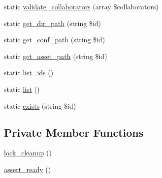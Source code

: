 \begin{DoxyCompactItemize}
static \hyperlink{classlibresignage_1_1common_1_1php_1_1slide_1_1Slide_a24d9d8a3e7fafb5fe6fc904b71ea732d}{validate\+\_\+collaborators} (array \$collaborators)
\item 
static \hyperlink{classlibresignage_1_1common_1_1php_1_1slide_1_1Slide_a11ba3a6fead2f889211a368a70b56a08}{get\+\_\+dir\+\_\+path} (string \$id)
\item 
static \hyperlink{classlibresignage_1_1common_1_1php_1_1slide_1_1Slide_a347881c12e3a389c8b4f3397328e8378}{get\+\_\+conf\+\_\+path} (string \$id)
\item 
static \hyperlink{classlibresignage_1_1common_1_1php_1_1slide_1_1Slide_a33bc0e5eadddc415740b36f1dded4159}{get\+\_\+asset\+\_\+path} (string \$id)
\item 
static \hyperlink{classlibresignage_1_1common_1_1php_1_1slide_1_1Slide_a234a166c9a496c6484629bae1f078318}{list\+\_\+ids} ()
\item 
static \hyperlink{classlibresignage_1_1common_1_1php_1_1slide_1_1Slide_aac4106d3da3ec25c0bf52e5b050cf336}{list} ()
\item 
static \hyperlink{classlibresignage_1_1common_1_1php_1_1slide_1_1Slide_a1b2ac4d07a7a9b2e2bf67bcbbaee0130}{exists} (string \$id)
\end{DoxyCompactItemize}
\subsection*{Private Member Functions}
\begin{DoxyCompactItemize}
\item 
\hyperlink{classlibresignage_1_1common_1_1php_1_1slide_1_1Slide_a5af3cec71f1be426c13a795e6fc9defb}{lock\+\_\+cleanup} ()
\item 
\hyperlink{classlibresignage_1_1common_1_1php_1_1slide_1_1Slide_a8c452cd038e3f3a464568729e842429f}{assert\+\_\+ready} ()
\end{DoxyCompactItemize}
